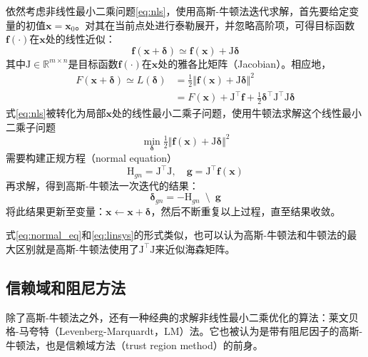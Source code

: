 依然考虑非线性最小二乘问题\eqref{eq:nls}，使用高斯-牛顿法迭代求解，首先要给定变量的初值$\bm{x}=\bm{x}_0$。对其在当前点处进行泰勒展开，并忽略高阶项，可得目标函数$\bm{f}(\cdot)$在$\bm{x}$处的线性近似：
\begin{equation}
    \bm{f}(\bm{x}+\bm{\delta}) \simeq \bm{f}(\bm{x}) + \mathrm{J}\bm{\delta}
\end{equation}
其中$\mathrm{J}\in\mathbb{R}^{m \times n}$是目标函数$\bm{f}(\cdot)$在$\bm{x}$处的雅各比矩阵（Jacobian）。相应地，
\begin{equation}
\begin{aligned}
    F(\bm{x}+\bm{\delta}) \simeq L(\bm{\delta})
        &= \tfrac{1}{2} \Vert \bm{f}(\bm{x}) + \mathrm{J}\bm{\delta} \Vert^2 \\
        &= F(\bm{x}) + \mathrm{J}^\top\bm{f} +
           \tfrac{1}{2}\bm{\delta}^\top\mathrm{J}^\top\mathrm{J}\bm{\delta}
\end{aligned}
\label{eq:linmod}
\end{equation}
式\eqref{eq:nls}被转化为局部$\bm{x}$处的线性最小二乘子问题，使用牛顿法求解这个线性最小二乘子问题
\begin{equation}
    \min_{\bm{\delta}} \tfrac{1}{2}
    \Vert \bm{f}(\bm{x}) + \mathrm{J}\bm{\delta} \Vert^2
    \label{eq:lls}
\end{equation}
需要构建正规方程（normal equation）
\begin{equation}
    \mathrm{H}_{gn} = \mathrm{J}^\top\mathrm{J}, \quad
    \bm{g}          = \mathrm{J}^\top\bm{f}(\bm{x})
    \label{eq:normal_eq}
\end{equation}
再求解，得到高斯-牛顿法一次迭代的结果：
\begin{equation}
    \bm{\delta}_{gn} = -\mathrm{H}_{gn} \enspace\setminus\enspace \bm{g}
    \label{eq:gn}
\end{equation}
将此结果更新至变量：$\bm{x}\leftarrow\bm{x}+\bm{\delta}$，然后不断重复以上过程，直至结果收敛。

式\eqref{eq:normal_eq}和\eqref{eq:linsys}的形式类似，也可以认为高斯-牛顿法和牛顿法的最大区别就是高斯-牛顿法使用了$\mathrm{J}^\top\mathrm{J}$来近似海森矩阵。

\subsection{信赖域和阻尼方法}

除了高斯-牛顿法之外，还有一种经典的求解非线性最小二乘优化的算法：莱文贝格-马夸特（Levenberg-Marquardt，LM）法。它也被认为是带有阻尼因子的高斯-牛顿法，也是信赖域方法（trust region method）的前身\citep{jorge2006numerical}。

